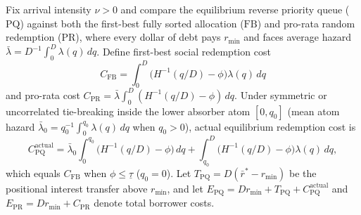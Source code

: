 Fix arrival intensity $\nu > 0$ and compare the equilibrium reverse priority queue ($\mathrm{PQ}$) against both the first-best fully sorted allocation ($\mathrm{FB}$) and pro-rata random redemption ($\mathrm{PR}$), where every dollar of debt pays $r_{\min}$ and faces average hazard $\bar{\lambda} = D^{-1}\int_0^D \lambda(q)\,dq$. Define first-best social redemption cost
\[
C_{\mathrm{FB}} = \int_0^D \bigl(H^{-1}(q/D) - \phi\bigr)\lambda(q)\,dq
\]
and pro-rata cost $C_{\mathrm{PR}} = \bar{\lambda}\int_0^D (H^{-1}(q/D) - \phi)\,dq$. Under symmetric or uncorrelated tie-breaking inside the lower absorber atom $[0, q_0]$ (mean atom hazard $\bar{\lambda}_0 = q_0^{-1}\int_0^{q_0}\lambda(q)\,dq$ when $q_0 > 0$), actual equilibrium redemption cost is
\[
C_{\mathrm{PQ}}^{\mathrm{actual}} = \bar{\lambda}_0\int_0^{q_0}\bigl(H^{-1}(q/D) - \phi\bigr)\,dq + \int_{q_0}^{D}\bigl(H^{-1}(q/D) - \phi\bigr)\lambda(q)\,dq,
\]
which equals $C_{\mathrm{FB}}$ when $\phi \le \underline{\tau}$ ($q_0 = 0$). Let $T_{\mathrm{PQ}} = D(\bar{r}^* - r_{\min})$ be the positional interest transfer above $r_{\min}$, and let $E_{\mathrm{PQ}} = D r_{\min} + T_{\mathrm{PQ}} + C_{\mathrm{PQ}}^{\mathrm{actual}}$ and $E_{\mathrm{PR}} = D r_{\min} + C_{\mathrm{PR}}$ denote total borrower costs.

